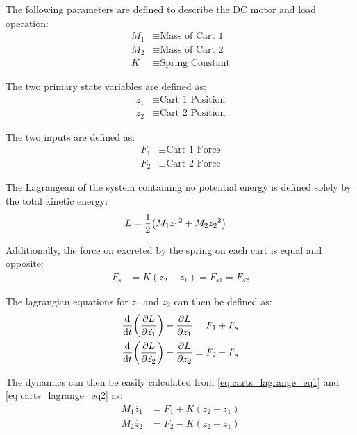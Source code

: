 \documentclass[]{article}
\begin{document}
		The following parameters are defined to describe the DC motor and load operation:
		\begin{align*}
			M_1 &\equiv \text{Mass of Cart 1}\\
			M_2 &\equiv \text{Mass of Cart 2}\\
			K &\equiv \text{Spring Constant}
		\end{align*}
		
		The two primary state variables are defined as:
		\begin{align*}
			z_1 &\equiv \text{Cart 1 Position}\\
			z_2 &\equiv \text{Cart 2 Position}
		\end{align*}
		
		The two inputs are defined as:
		\begin{align*}
			F_1 &\equiv \text{Cart 1 Force}\\
			F_2 &\equiv \text{Cart 2 Force}
		\end{align*}
		
		The Lagrangean of the system containing no potential energy is defined solely by the total kinetic energy:
		\begin{align}
			L &= \frac{1}{2} \qty(M_1 \dot{z_1}^2 + M_2 \dot{z_2}^2) \label{eq:carts_lagrange}
		\end{align}
		
		Additionally, the force on excreted by the spring on each cart is equal and opposite:
		\begin{align}
			F_s &= K(z_2 - z_1) = F_{s1} = F_{s2} \label{eq:spring_force}
		\end{align}
		
		The lagrangian equations for $z_1$ and $z_2$ can then be defined as:
		\begin{align}
			\dv{t}\qty(\pdv{L}{\dot{z_1}}) - \pdv{L}{z_1} &= F_1 + F_s \label{eq:carts_lagrange_eq1}\\
			\dv{t}\qty(\pdv{L}{\dot{z_2}}) - \pdv{L}{z_2} &= F_2 - F_s \label{eq:carts_lagrange_eq2}
		\end{align}	
		
		The dynamics can then be easily calculated from \eqref{eq:carts_lagrange_eq1} and \eqref{eq:carts_lagrange_eq2} as:
		\begin{align}
			M_1 \ddot{z_1} &= F_1 + K(z_2 - z_1) \label{eq:carts_state_eq1}\\
			M_2 \ddot{z_2} &= F_2 - K(z_2 - z_1) \label{eq:carts_state_eq2}
		\end{align}
		
\end{document}
